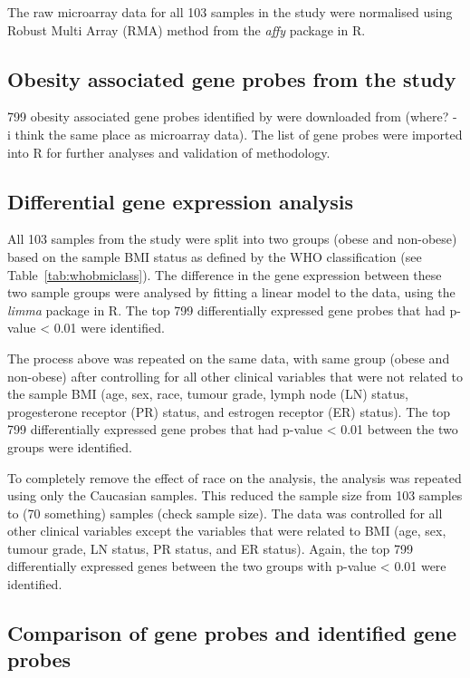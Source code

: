 The raw microarray data for all 103 samples in the study were normalised using Robust Multi Array (RMA) method from the \textit{affy} package in R.

\subsection{Obesity associated gene probes from the \citet{Creighton2012} study}
\label{subsec:crobsgene}

799 obesity associated gene probes identified by \citet{Creighton2012} were downloaded from (where? - i think the same place as microarray data).
The list of gene probes were imported into R for further analyses and validation of methodology.

\subsection{Differential gene expression analysis}
\label{subsec:deg}

All 103 samples from the \citet{Creighton2012} study were split into two groups (obese and non-obese) based on the sample BMI status as defined by the WHO classification (see Table~\ref{tab:whobmiclass}).
The difference in the gene expression between these two sample groups were analysed by fitting a linear model to the data, using the \textit{limma} package in R.
The top 799 differentially expressed gene probes that had p-value \textless{} 0.01 were identified.

The process above was repeated on the same data, with same group (obese and non-obese) after controlling for all other clinical variables that were not related to the sample BMI (age, sex, race, tumour grade, lymph node (LN) status, progesterone receptor (PR) status, and estrogen receptor (ER) status).
The top 799 differentially expressed gene probes that had p-value \textless{} 0.01 between the two groups were identified.

To completely remove the effect of race on the analysis, the analysis was repeated using only the Caucasian samples.
This reduced the sample size from 103 samples to (70 something) samples (check sample size).
The data was controlled for all other clinical variables except the variables that were related to BMI (age, sex, tumour grade, LN status, PR status, and ER status).
Again, the top 799 differentially expressed genes between the two groups with p-value \textless{} 0.01 were identified.

\subsection{Comparison of \citet{Creighton2012} gene probes and identified gene probes}
\label{subsec:cfgeneprobes}

